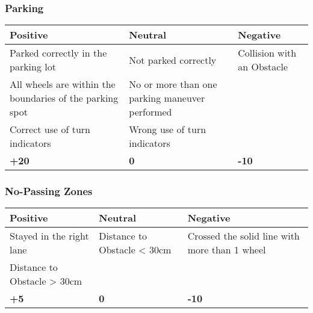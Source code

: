 {\begin{highlight}
		\subsubsection*{Parking}
		\begin{table}[H]
			\begin{tabularx}{\textwidth}{XXX}
				\toprule
				\textbf{Positive}                                        & \textbf{Neutral}                               & \textbf{Negative}          \\
				\midrule
				Parked correctly in the parking lot                      & Not parked correctly                           & Collision with an Obstacle \\
				All wheels are within the boundaries of the parking spot & No or more than one parking maneuver performed &                            \\
				Correct use of turn indicators                           & Wrong use of turn indicators                   &                            \\
				\topstrut
				\textbf{+20}                                             & \textbf{0}                                     & \textbf{-10}               \\
				\bottomrule
			\end{tabularx}
		\end{table}

		\subsubsection*{No-Passing Zones}
		\begin{table}[H]
			\begin{tabularx}{\textwidth}{XXX}
				\toprule
				\textbf{Positive}           & \textbf{Neutral}            & \textbf{Negative}                             \\
				\midrule
				Stayed in the right lane    & Distance to Obstacle < 30cm & Crossed the solid line with more than 1 wheel \\
				Distance to Obstacle > 30cm &                             &                                               \\
				\topstrut
				\textbf{+5}                 & \textbf{0}                  & \textbf{-10}                                  \\
				\bottomrule
			\end{tabularx}
		\end{table}


\end{highlight}}
